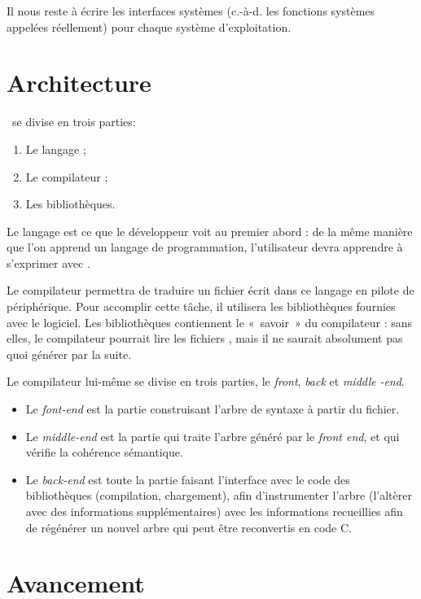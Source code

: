 \documentclass[francais]{rtxreport}
\begin{document}
Il nous reste à écrire les interfaces systèmes (c.-à-d. les fonctions systèmes
appelées réellement) pour chaque système d’exploitation.

\section{Architecture}
\rtx\ se divise en trois parties:
\begin{enumerate}
	\item Le langage ;
	\item Le compilateur ;
	\item Les bibliothèques.
\end{enumerate}

Le langage est ce que le développeur voit au premier abord : de la même manière
que l’on apprend un langage de programmation, l’utilisateur devra apprendre à
s’exprimer avec \rtx.

Le compilateur permettra de traduire un fichier écrit dans ce langage en pilote
de périphérique. Pour accomplir cette tâche, il utilisera les bibliothèques
fournies avec le logiciel. Les bibliothèques contiennent le «~savoir~» du
compilateur : sans elles, le compilateur pourrait lire les fichiers \rtx, mais
il ne saurait absolument pas quoi générer par la suite.

Le compilateur lui-même se divise en trois parties, le \emph{front}, \emph{back}
et \emph{middle} \emph{-end}.

\begin{itemize}
	\item Le \emph{font-end} est la partie construisant l’arbre de syntaxe à
          partir du fichier.
	\item Le \emph{middle-end} est la partie qui traite l’arbre généré par
          le \emph{front end}, et qui vérifie la cohérence sémantique.
	\item Le \emph{back-end} est toute la partie faisant l’interface avec le
          code des bibliothèques (compilation, chargement), afin d'instrumenter
          l'arbre (l’altèrer avec des informations supplémentaires) avec les
          informations recueillies afin de régénérer un nouvel arbre qui peut
          être reconvertis en code C.
\end{itemize}

\section{Avancement}
\end{document}
